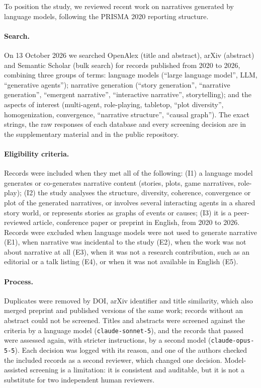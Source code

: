 \documentclass[12pt]{article}
\begin{document}
To position the study, we reviewed recent work on narratives generated by
language models, following the PRISMA 2020 reporting structure.

\paragraph{Search.} On 13 October 2026 we searched OpenAlex (title and
abstract), arXiv (abstract) and Semantic Scholar (bulk search) for records
published from 2020 to 2026, combining three groups of terms: language
models (\enquote{large language model}, LLM, \enquote{generative agents});
narrative generation (\enquote{story generation}, \enquote{narrative
generation}, \enquote{emergent narrative}, \enquote{interactive narrative},
storytelling); and the aspects of interest (multi-agent, role-playing,
tabletop, \enquote{plot diversity}, homogenization, convergence,
\enquote{narrative structure}, \enquote{causal graph}). The exact strings,
the raw responses of each database and every screening decision are in the
supplementary material and in the public repository.

\paragraph{Eligibility criteria.} Records were included when they met all of
the following: (I1) a language model generates or co-generates narrative
content (stories, plots, game narratives, role-play); (I2) the study analyses
the structure, diversity, coherence, convergence or plot of the generated
narratives, or involves several interacting agents in a shared story world,
or represents stories as graphs of events or causes; (I3) it is a
peer-reviewed article, conference paper or preprint in English, from 2020 to
2026. Records were excluded when language models were not used to generate
narrative (E1), when narrative was incidental to the study (E2), when the
work was not about narrative at all (E3), when it was not a research
contribution, such as an editorial or a talk listing (E4), or when it was not
available in English (E5).

\paragraph{Process.} Duplicates were removed by DOI, arXiv identifier and
title similarity, which also merged preprint and published versions of the
same work; records without an abstract could not be screened. Titles and
abstracts were screened against the criteria by a language model
(\texttt{claude-sonnet-5}), and the records that passed were assessed again,
with stricter instructions, by a second model (\texttt{claude-opus-5-5}).
Each decision was logged with its reason, and one of the authors checked the
included records as a second reviewer, which changed one decision.
Model-assisted screening is a limitation: it is consistent and auditable, but
it is not a substitute for two independent human reviewers.
\end{document}
